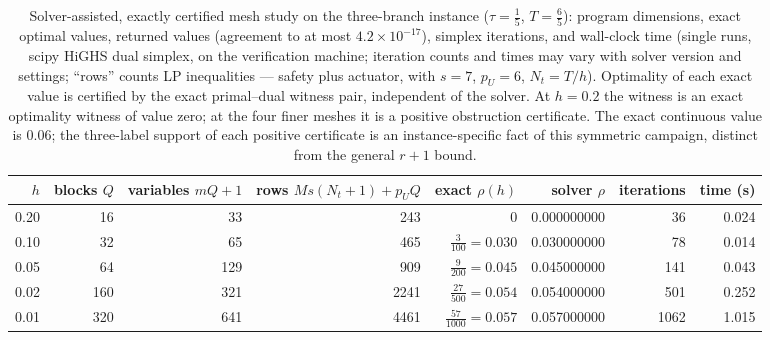 \documentclass[10pt,twocolumn]{article}
\theoremstyle{plain}
\theoremstyle{definition}
\theoremstyle{remark}
\begin{document}
\begin{table}[t]
\centering
\footnotesize
\begin{tabular}{@{}r|r|r|r|r|r|r|r@{}}
\toprule
\(h\) & blocks \(Q\) & variables \(mQ{+}1\) & rows \(Ms(N_t{+}1)+p_UQ\) & exact \(\rho(h)\) & solver \(\rho\) & iterations & time (s) \\
\midrule
0.20 & 16 & 33  & 243  & \(0\) & 0.000000000 & 36   & 0.024 \\
0.10 & 32 & 65  & 465  & \(\tfrac{3}{100} = 0.030\) & 0.030000000 & 78   & 0.014 \\
0.05 & 64 & 129 & 909  & \(\tfrac{9}{200} = 0.045\) & 0.045000000 & 141  & 0.043 \\
0.02 & 160 & 321 & 2241 & \(\tfrac{27}{500} = 0.054\) & 0.054000000 & 501  & 0.252 \\
0.01 & 320 & 641 & 4461 & \(\tfrac{57}{1000} = 0.057\) & 0.057000000 & 1062 & 1.015 \\
\bottomrule
\end{tabular}
\caption{Solver-assisted, exactly certified mesh study on the three-branch
instance (\(\tau = \tfrac15\), \(T = \tfrac65\)): program dimensions,
exact optimal values, returned values (agreement to at most
\(4.2 \times 10^{-17}\)), simplex iterations, and wall-clock time (single
runs, scipy HiGHS dual simplex, on the verification machine; iteration
counts and times may vary with solver version and settings; ``rows'' counts
LP inequalities --- safety plus actuator, with \(s = 7\), \(p_U = 6\),
\(N_t = T/h\)). Optimality of each exact value is certified by the exact
primal--dual witness pair, independent of the solver. At \(h = 0.2\) the
witness is an exact optimality witness of value zero; at the four finer
meshes it is a positive obstruction certificate. The exact continuous value
is \(0.06\); the three-label support of each positive certificate is an
instance-specific fact of this symmetric campaign, distinct from the
general \(r + 1\) bound.}
\label{tab:mesh}
\end{table}
\end{document}

